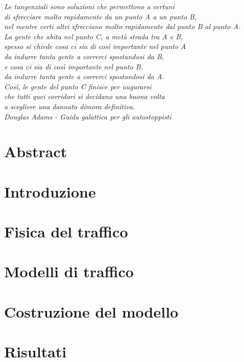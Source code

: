 \documentclass[12pt,a4paper]{report}
\begin{document}
\thispagestyle{empty}
\addtocounter{page}{-1}
\pagebreak
\hspace{0pt}
\vfill
\begin{flushright}
\emph{Le tangenziali sono soluzioni che permettono a certuni\\
di sfrecciare molto rapidamente da un punto A a un punto B,\\
nel mentre certi altri sfrecciano molto rapidamente dal punto B al punto A.\\
La gente che abita nel punto C, a met\`a strada tra A e B,\\
spesso si chiede cosa ci sia di cos\`i importante nel punto A\\
da indurre tanta gente a correrci spostandosi da B,\\
e cosa ci sia di così importante nel punto B,\\
da indurre tanta gente a correrci spostandosi da A.\\
Cos\`i, le gente del punto C finisce per augurarsi\\
che tutti quei corridori si decidano una buona volta\\
a scegliere una dannata dimora definitiva.}\\
\vspace{\baselineskip}
\emph{Douglas Adams - Guida galattica per gli autostoppisti}
\end{flushright}
\vfill
\hspace{0pt}
\pagebreak

\shipout\null
\chapter*{\centering \Large Abstract}

\tableofcontents
\listoffigures

\chapter*{Introduzione}


\chapter{Fisica del traffico}


\chapter{Modelli di traffico}


\chapter{Costruzione del modello}


\chapter{Risultati}


\appendix


\printbibliography
\end{document}
